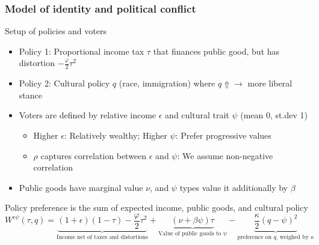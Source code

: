 \documentclass[aspectratio=169]{beamer}
\begin{document}
\begin{frame}
\frametitle{Model of identity and political conflict} 
Setup of policies and voters
\begin{itemize}\setlength\itemsep{3pt}
\item Policy 1: Proportional income tax $\tau$ that finances public good, but has distortion $-\frac{\varphi}{2}\tau^2$
\item Policy 2: Cultural policy $q$ (race, immigration) where $q\Uparrow\to$ more liberal stance
\item Voters are defined by relative income $\epsilon$ and cultural trait $\psi$ (mean 0, st.dev 1)
\begin{itemize}\setlength\itemsep{3pt}
\item Higher $\epsilon$: Relatively wealthy; Higher $\psi$: Prefer progressive values
\item $\rho$ captures correlation between $\epsilon$ and $\psi$: We assume non-negative correlation
\end{itemize}
\item Public goods have marginal value $\nu$, and $\psi$ types value it additionally by $\beta$
\end{itemize}\medskip
Policy preference is the sum of expected income, public goods, and cultural policy
\[
W^{\epsilon\psi}(\tau,q)=\underbrace{(1+\epsilon)(1-\tau)-\frac{\varphi}{2}\tau^2}_{\text{Income net of taxes and distortions}}+\underbrace{(\nu+\beta\psi)\tau}_{\text{Value of public goods to $\psi$}}-\underbrace{\frac{\kappa}{2}(q-\psi)^2}_{\text{preference on $q$, weighed by $\kappa$}}
\]
\end{frame}
\end{document}
